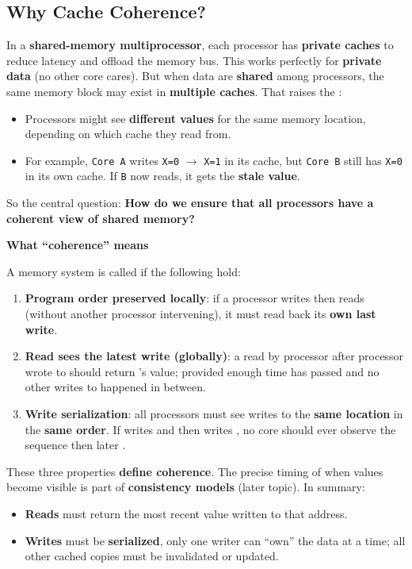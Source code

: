 \subsection{Why Cache Coherence?}\label{subsection: Why Cache Coherence}

In a \textbf{shared-memory multiprocessor}, each processor has \textbf{private caches} to reduce latency and offload the memory bus. This works perfectly for \textbf{private data} (no other core cares). But when data are \textbf{shared} among processors, the same memory block may exist in \textbf{multiple caches}. That raises the :
\begin{itemize}
    \item Processors might see \textbf{different values} for the same memory location, depending on which cache they read from.
    \item For example, \texttt{Core A} writes \texttt{X=0} $\to$ \texttt{X=1} in its cache, but \texttt{Core B} still has \texttt{X=0} in its own cache. If \texttt{B} now reads, it gets the \textbf{stale value}.
\end{itemize}
So the central question: \textbf{How do we ensure that all processors have a coherent view of shared memory?}

\highspace
\begin{flushleft}
    \textcolor{Green3}{ \textbf{What ``coherence'' means}}
\end{flushleft}
A memory system is called  if the following hold:
\begin{enumerate}
    \item \textbf{Program order preserved locally}: if a processor writes  then reads  (without another processor intervening), it must read back its \textbf{own last write}.
    \item \textbf{Read sees the latest write (globally)}: a read by processor  after processor  wrote to  should return 's value; provided enough time has passed and no other writes to  happened in between.
    \item \textbf{Write serialization}: all processors must see writes to the \textbf{same location} in the \textbf{same order}. If  writes  and then  writes , no core should ever observe the sequence  then later .
\end{enumerate}
These three properties \textbf{define coherence}. The precise timing of when values become visible is part of \textbf{consistency models} (later topic). In summary:
\begin{itemize}
    \item \textbf{Reads} must return the most recent value written to that address.
    \item \textbf{Writes} must be \textbf{serialized}, only one writer can ``own'' the data at a time; all other cached copies must be invalidated or updated.
\end{itemize}

